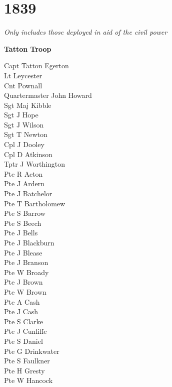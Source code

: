 \chapter*{1839}

\begin{center}
  \textit{Only includes those deployed in aid of the civil power}
\end{center}

\begin{center}
  \Large
  \textbf{Tatton Troop}
\end{center}

\begin{multicols}{2}
  \noindent
  Capt Tatton Egerton \\
  Lt Leycester \\
  Cnt Pownall \\
  Quartermaster John Howard \\
  Sgt Maj Kibble \\
  Sgt J Hope \\
  Sgt J Wilson \\
  Sgt T Newton \\
  Cpl J Dooley \\
  Cpl D Atkinson \\
  Tptr J Worthington \\
  Pte R Acton \\
  Pte J Ardern \\
  Pte J Batchelor \\
  Pte T Bartholomew \\
  Pte S Barrow \\
  Pte S Beech \\
  Pte J Bells \\
  Pte J Blackburn \\
  Pte J Blease \\
  Pte J Branson \\
  Pte W Broady \\
  Pte J Brown \\
  Pte W Brown \\
  Pte A Cash \\
  Pte J Cash \\
  Pte S Clarke \\
  Pte J Cunliffe \\
  Pte S Daniel \\
  Pte G Drinkwater \\
  Pte S Faulkner \\
  Pte H Gresty \\
  Pte W Hancock \\

\end{multicols}
